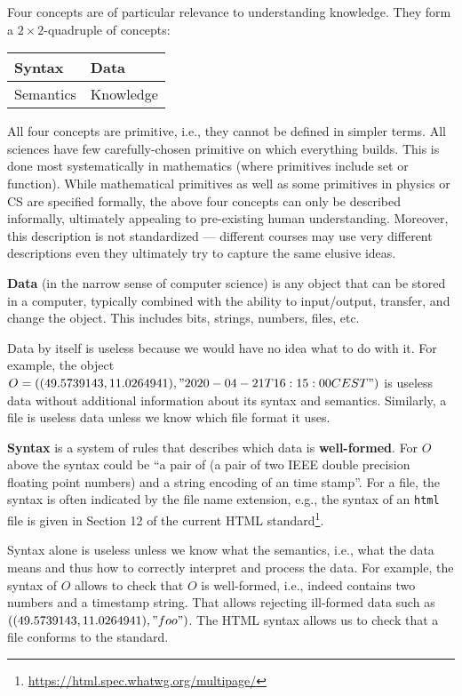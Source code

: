 Four concepts are of particular relevance to understanding knowledge.
They form a $2\times 2$-quadruple of concepts:

\begin{center}
\begin{tabular}{l|l}
Syntax & Data \\
\hline
Semantics & Knowledge
\end{tabular}
\end{center}

All four concepts are primitive, i.e., they cannot be defined in simpler terms.
All sciences have few carefully-chosen primitive on which everything builds.
This is done most systematically in mathematics (where primitives include set or function).
While mathematical primitives as well as some primitives in physics or CS are specified formally, the above four concepts can only be described informally, ultimately appealing to pre-existing human understanding.
Moreover, this description is not standardized --- different courses may use very different descriptions even they ultimately try to capture the same elusive ideas.

\textbf{Data} (in the narrow sense of computer science) is any object that can be stored in a computer, typically combined with the ability to input/output, transfer, and change the object.
This includes bits, strings, numbers, files, etc.

Data by itself is useless because we would have no idea what to do with it.
For example, the object $O=((49.5739143, 11.0264941), "2020-04-21T16:15:00CEST")$ is useless data without additional information about its syntax and semantics.
Similarly, a file is useless data unless we know which file format it uses.

\textbf{Syntax} is a system of rules that describes which data is \textbf{well-formed}.
For $O$ above the syntax could be ``a pair of (a pair of two IEEE double precision floating point numbers) and a string encoding of an time stamp''. 
For a file, the syntax is often indicated by the file name extension, e.g., the syntax of an \texttt{html} file is given in Section 12 of the current HTML standard\footnote{\url{https://html.spec.whatwg.org/multipage/}}.

Syntax alone is useless unless we know what the semantics, i.e., what the data means and thus how to correctly interpret and process the data.
For example, the syntax of $O$ allows to check that $O$ is well-formed, i.e., indeed contains two numbers and a timestamp string.
That allows rejecting ill-formed data such as $((49.5739143, 11.0264941), "foo")$.
The HTML syntax allows us to check that a file conforms to the standard.

